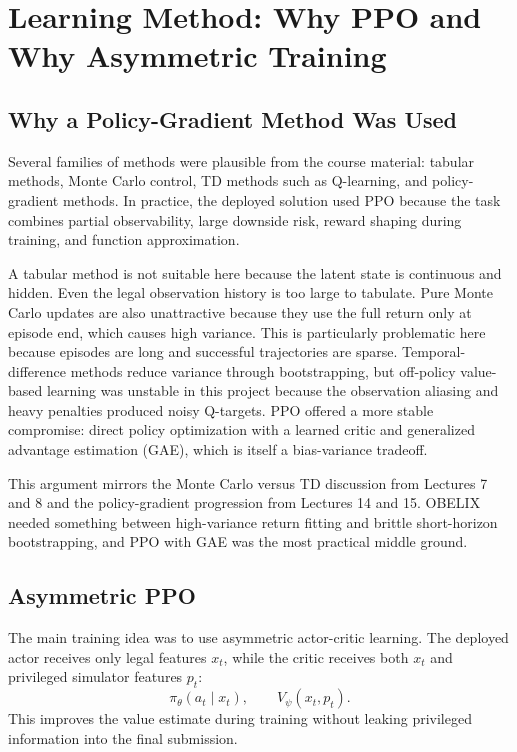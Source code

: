 \documentclass[11pt, oneside]{article}   	%
\begin{document}
\section{Learning Method: Why PPO and Why Asymmetric Training}

\subsection{Why a Policy-Gradient Method Was Used}

Several families of methods were plausible from the course material: tabular methods,
Monte Carlo control, TD methods such as Q-learning, and policy-gradient methods. In
practice, the deployed solution used PPO because the task combines partial observability,
large downside risk, reward shaping during training, and function approximation.

A tabular method is not suitable here because the latent state is continuous and hidden.
Even the legal observation history is too large to tabulate. Pure Monte Carlo updates are
also unattractive because they use the full return only at episode end, which causes high
variance. This is particularly problematic here because episodes are long and successful
trajectories are sparse. Temporal-difference methods reduce variance through
bootstrapping, but off-policy value-based learning was unstable in this project because
the observation aliasing and heavy penalties produced noisy Q-targets. PPO offered a
more stable compromise: direct policy optimization with a learned critic and generalized
advantage estimation (GAE), which is itself a bias-variance tradeoff.

This argument mirrors the Monte Carlo versus TD discussion from Lectures 7 and 8 and the
policy-gradient progression from Lectures 14 and 15. OBELIX needed something between
high-variance return fitting and brittle short-horizon bootstrapping, and PPO with GAE
was the most practical middle ground.

\subsection{Asymmetric PPO}

The main training idea was to use asymmetric actor-critic learning. The deployed actor
receives only legal features \(x_t\), while the critic receives both \(x_t\) and privileged
simulator features \(p_t\):
\[
  \pi_\theta(a_t\mid x_t),
  \qquad
  V_\psi(x_t,p_t).
\]
This improves the value estimate during training without leaking privileged information
into the final submission.
\end{document}
